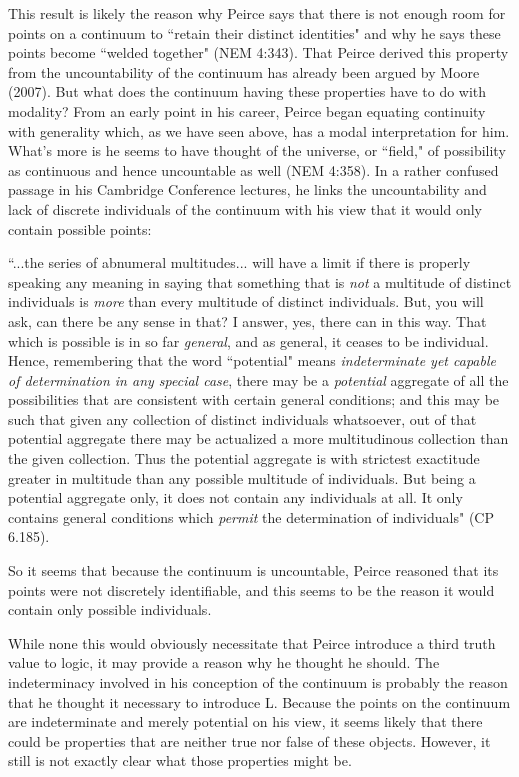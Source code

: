 \documentclass[12pt]{article}
\begin{document}
This result is likely the reason why Peirce says that there is not enough room for points on a continuum to ``retain their distinct identities" and why he says these points become ``welded together" (NEM 4:343). That Peirce derived this property from the uncountability of the continuum has already been argued by Moore (2007). But what does the continuum having these properties have to do with modality? From an early point in his career, Peirce began equating continuity with generality which, as we have seen above, has a modal interpretation for him. What's more is he seems to have thought of the universe, or ``field," of possibility as continuous and hence uncountable as well (NEM 4:358). In a rather confused passage in his Cambridge Conference lectures, he links the uncountability and lack of discrete individuals of the continuum with his view that it would only contain possible points:
\begin{singlespace}
\noindent ``...the series of abnumeral multitudes... will have a limit if there is properly speaking any meaning in saying that something that is \textit{not} a multitude of distinct individuals is \textit{more} than every multitude of distinct individuals. But, you will ask, can there be any sense in that? I answer, yes, there can in this way. That which is possible is in so far \textit{general}, and as general, it ceases to be individual. Hence, remembering that the word ``potential" means \textit{indeterminate yet capable of determination in any special case}, there may be a \textit{potential} aggregate of all the possibilities that are consistent with certain general conditions; and this may be such that given any collection of distinct individuals whatsoever, out of that potential aggregate there may be actualized a more multitudinous collection than the given collection. Thus the potential aggregate is with strictest exactitude greater in multitude than any possible multitude of individuals. But being a potential aggregate only, it does not contain any individuals at all. It only contains general conditions which \textit{permit} the determination of individuals" (CP 6.185).
\end{singlespace}
\noindent So it seems that because the continuum is uncountable, Peirce reasoned that its points were not discretely identifiable, and this seems to be the reason it would contain only possible individuals.

While none this would obviously necessitate that Peirce introduce a third truth value to logic, it may provide a reason why he thought he should. The indeterminacy involved in his conception of the continuum is probably the reason that he thought it necessary to introduce L. Because the points on the continuum are indeterminate and merely potential on his view, it seems likely that there could be properties that are neither true nor false of these objects. However, it still is not exactly clear what those properties might be.
\end{document}
